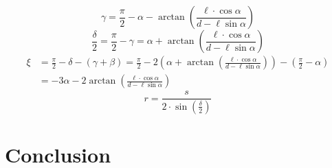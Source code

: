 \documentclass[abstract,toc,los,english,11pt,glossaries]{jluthesis}
\begin{document}
\begin{equation}
	\gamma = \frac{\pi}{2} - \alpha - \arctan\left(\frac{\ell\cdot\cos\alpha}{d - \ell\sin\alpha}\right)
\end{equation}
\begin{equation}
	\frac{\delta}{2} = \frac{\pi}{2} - \gamma = \alpha + \arctan\left(\frac{\ell\cdot\cos\alpha}{d - \ell\sin\alpha}\right)
\end{equation}
\begin{equation}
	\begin{aligned}
	\xi &= \frac{\pi}{2} - \delta - \left(\gamma + \beta\right) = \frac{\pi}{2} - 2\left(\alpha + \arctan\left(\frac{\ell\cdot\cos\alpha}{d - \ell\sin\alpha}\right)\right) - \left(\frac{\pi}{2} - \alpha\right) \\
	&= -3\alpha - 2\arctan\left(\frac{\ell\cdot\cos\alpha}{d - \ell\sin\alpha}\right)
\end{aligned}
\end{equation}
\begin{equation}
	r = \frac{s}{2\cdot\sin\left(\frac{\delta}{2}\right)}
\end{equation}
\clearpage
\section{Conclusion}
\clearpage
\backmatter
\end{document}
